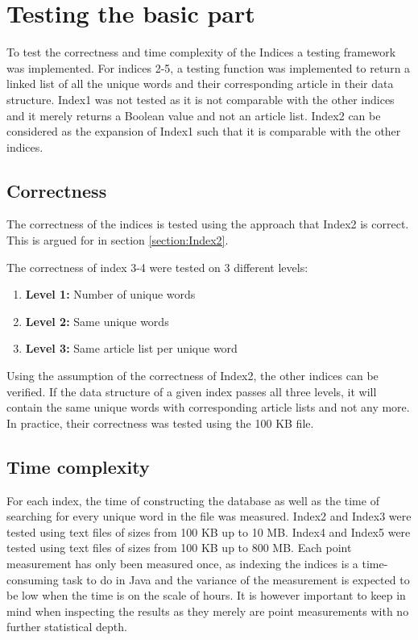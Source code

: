 \section{Testing the basic part}
To test the correctness and time complexity of the Indices a testing framework was implemented. For indices 2-5, a testing function was implemented to return a linked list of all the unique words and their corresponding article in their data structure. Index1 was not tested as it is not comparable with the other indices and it merely returns a Boolean value and not an article list. Index2 can be considered as the expansion of Index1 such that it is comparable with the other indices.

\subsection{Correctness}
The correctness of the indices is tested using the approach that Index2 is correct. This is argued for in section \ref{section:Index2}.

The correctness of index 3-4 were tested on 3 different levels:

\begin{enumerate}
    \item[] \textbf{Level 1:} Number of unique words 
    \item[] \textbf{Level 2:} Same unique words
    \item[] \textbf{Level 3:} Same article list per unique word
\end{enumerate}

Using the assumption of the correctness of Index2, the other indices can be verified. If the data structure of a given index passes all three levels, it will contain the same unique words with corresponding article lists and not any more. In practice, their correctness was tested using the 100 KB file. 

\subsection{Time complexity}
For each index, the time of constructing the database as well as the time of searching for every unique word in the file was measured. Index2 and Index3 were tested using text files of sizes from 100 KB up to 10 MB. Index4 and Index5 were tested using text files of sizes from 100 KB up to 800 MB.
Each point measurement has only been measured once, as indexing the indices is a time-consuming task to do in Java and the variance of the measurement is expected to be low when the time is on the scale of hours. It is however important to keep in mind when inspecting the results as they merely are point measurements with no further statistical depth.   

